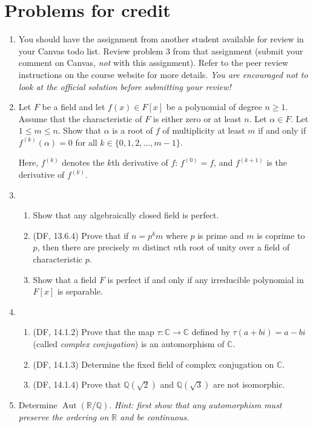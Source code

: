 \documentclass{amsart}
\theoremstyle{definition}
\newcommand{\Qq}{\mathbb{Q}}
\newcommand{\Rr}{\mathbb{R}}
\newcommand{\Cc}{\mathbb{C}}
\newcommand{\Aut}{\operatorname{Aut}}
\begin{document}
\section*{Problems for credit}
\begin{enumerate}
\item You should have the assignment from another student available for review in your Canvas todo list. Review problem 3 from that assignment (submit your comment on Canvas, \emph{not} with this assignment). Refer to the peer review instructions on the course website for more details. \emph{You are encouraged not to look at the official solution before submitting your review!}

\item Let $F$ be a field and let $f (x) \in F[x]$ be a polynomial of degree $n \ge 1$. Assume that the characteristic of $F$ is either zero or at least $n$. Let $\alpha \in F$. Let $1 \le m \le n$. Show that $\alpha$ is a root of $f$ of multiplicity at least $m$ if and only if $f^{(k)} (\alpha)  = 0$ for all $k \in \{0, 1, 2, \ldots, m - 1\}$. 

  Here, $f^{(k)}$ denotes the $k$th derivative of $f$: $f^{(0)} = f$, and $f^{(k + 1)}$ is the derivative of $f^{(k)}$. 
\item
  \begin{enumerate}
  \item Show that any algebraically closed field is perfect.
  \item (DF, 13.6.4) Prove that if $n = p^k m$ where $p$ is prime and $m$ is coprime to $p$, then there are precisely $m$ distinct $n$th root of unity over a field of characteristic $p$.
  \item Show that a field $F$ is perfect if and only if any irreducible polynomial in $F[x]$ is separable.
  \end{enumerate}
\item
  \begin{enumerate}
  \item (DF, 14.1.2) Prove that the map $\tau: \Cc \to \Cc$ defined by $\tau (a + bi) = a- bi$ (called \emph{complex conjugation}) is an automorphism of $\Cc$.
  \item (DF, 14.1.3) Determine the fixed field of complex conjugation on $\Cc$.
  \item (DF, 14.1.4) Prove that $\Qq (\sqrt{2})$ and $\Qq (\sqrt{3})$ are not isomorphic.
  \end{enumerate}
\item Determine $\Aut (\Rr / \Qq)$. \emph{Hint: first show that any automorphism must preserve the ordering on $\Rr$ and be continuous.}

\end{enumerate}
\end{document}
